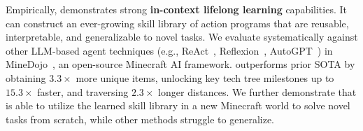 Empirically, \voyager demonstrates strong \textbf{in-context lifelong learning} capabilities. It can construct an ever-growing skill library of action programs that are reusable, interpretable, and generalizable to novel tasks.
We evaluate \voyager systematically against other LLM-based agent techniques (e.g., ReAct~\cite{yao2022react}, Reflexion~\cite{shinn2023reflexion}, AutoGPT~\cite{autogpt}) in MineDojo~\cite{fan2022minedojo}, an open-source Minecraft AI framework. 
\voyager outperforms prior SOTA by obtaining $3.3 \times$ more unique items, unlocking key tech tree milestones up to $15.3 \times$ faster, and traversing $2.3 \times$ longer distances. We further demonstrate that \voyager is able to utilize the learned skill library in a new Minecraft world to solve novel tasks from scratch, while other methods struggle to generalize.

